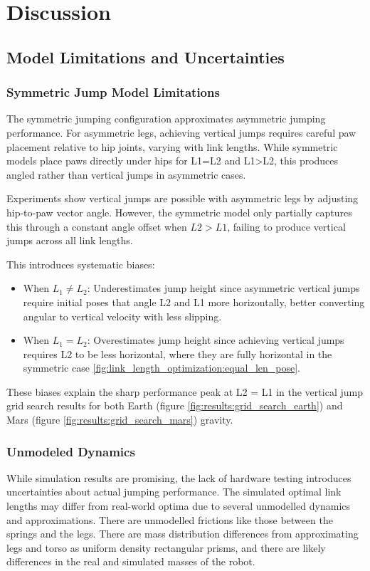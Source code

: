 \section{Discussion}

\subsection{Model Limitations and Uncertainties}

\subsubsection{Symmetric Jump Model Limitations}
The symmetric jumping configuration approximates asymmetric jumping performance. For asymmetric legs, achieving vertical jumps requires careful paw placement relative to hip joints, varying with link lengths. While symmetric models place paws directly under hips for L1=L2 and L1>L2, this produces angled rather than vertical jumps in asymmetric cases.

Experiments show vertical jumps are possible with asymmetric legs by adjusting hip-to-paw vector angle. However, the symmetric model only partially captures this through a constant angle offset when $L2 > L1$, failing to produce vertical jumps across all link lengths.

This introduces systematic biases:
\begin{itemize}
    \item When \(L_1 \neq L_2\): Underestimates jump height since asymmetric vertical jumps require initial poses that angle L2 and L1 more horizontally, better converting angular to vertical velocity with less slipping.
    \item When \(L_1 = L_2\): Overestimates jump height since achieving vertical jumps requires L2 to be less horizontal, where they are fully horizontal in the symmetric case \ref{fig:link_length_optimization:equal_len_pose}.
\end{itemize}

These biases explain the sharp performance peak at L2 = L1 in the vertical jump grid search results  for both Earth (figure \ref{fig:results:grid_search_earth}) and Mars (figure \ref{fig:results:grid_search_mars}) gravity.

\subsubsection{Unmodeled Dynamics}
While simulation results are promising, the lack of hardware testing introduces uncertainties about actual jumping performance. The 
simulated optimal link lengths may differ from real-world optima due to several unmodelled dynamics and approximations. There are 
unmodelled frictions like those between the springs and the legs. There are mass distribution differences from approximating legs and 
torso as uniform density rectangular prisms, and there are likely differences in the real and simulated masses of the robot.

